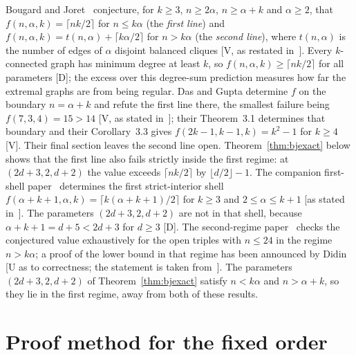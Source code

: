 \documentclass[11pt]{article}
\theoremstyle{remark}
\begin{document}
Bougard and Joret~\cite[Conjecture~1]{BJ} conjecture, for $k\ge3$, $n\ge2\alpha$, $n\ge\alpha+k$ and $\alpha\ge2$, that $f(n,\alpha,k)=\lceil nk/2\rceil$ for $n\le k\alpha$ (the \emph{first line}) and $f(n,\alpha,k)=t(n,\alpha)+\lceil k\alpha/2\rceil$ for $n>k\alpha$ (the \emph{second line}), where $t(n,\alpha)$ is the number of edges of $\alpha$ disjoint balanced cliques [V, as restated in~\cite{SR}]. Every $k$-connected graph has minimum degree at least $k$, so $f(n,\alpha,k)\ge\lceil nk/2\rceil$ for all parameters [D]; the excess over this degree-sum prediction measures how far the extremal graphs are from being regular. Das and Gupta determine $f$ on the boundary $n=\alpha+k$ and refute the first line there, the smallest failure being $f(7,3,4)=15>14$ [V, as stated in~\cite{SR}]; their Theorem~3.1 determines that boundary and their Corollary~3.3 gives $f(2k-1,k-1,k)=k^2-1$ for $k\ge4$~\cite{DG} [V]. Their final section leaves the second line open. Theorem~\ref{thm:bjexact} below shows that the first line also fails strictly inside the first regime: at $(2d+3,2,d+2)$ the value exceeds $\lceil nk/2\rceil$ by $\lfloor d/2\rfloor-1$. The companion first-shell paper~\cite{Shell} determines the first strict-interior shell $f(\alpha+k+1,\alpha,k)=\lceil k(\alpha+k+1)/2\rceil$ for $k\ge3$ and $2\le\alpha\le k+1$ [as stated in~\cite{Shell}]. The parameters $(2d+3,2,d+2)$ are not in that shell, because $\alpha+k+1=d+5<2d+3$ for $d\ge3$ [D]. The second-regime paper~\cite{SR} checks the conjectured value exhaustively for the open triples with $n\le24$ in the regime $n>k\alpha$; a proof of the lower bound in that regime has been announced by Didin~\cite{Didin} [U as to correctness; the statement is taken from~\cite{SR}]. The parameters $(2d+3,2,d+2)$ of Theorem~\ref{thm:bjexact} satisfy $n<k\alpha$ and $n>\alpha+k$, so they lie in the first regime, away from both of these results.

\section{Proof method for the fixed order}\label{sec:fixed}
\end{document}
